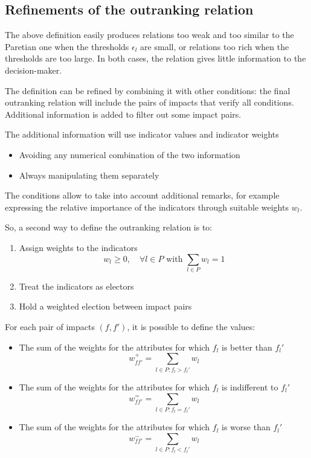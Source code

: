 \subsection{Refinements of the outranking relation}

The above definition easily produces relations too weak and too similar to the Paretian one when the thresholds $\epsilon_l$ are small, or relations too rich when the thresholds are too large. In both cases, the relation gives little information to the decision-maker.

The definition can be refined by combining it with other conditions: the final outranking relation will include the pairs of impacts that verify all conditions. Additional information is added to filter out some impact pairs.

The additional information will use indicator values and indicator weights
\begin{itemize}
	\item Avoiding any numerical combination of the two information
	
	\item Always manipulating them separately
\end{itemize}

The conditions allow to take into account additional remarks, for example expressing the relative importance of the indicators through suitable weights $w_l$.

So, a second way to define the outranking relation is to:
\begin{enumerate}
	\item Assign weights to the indicators
	$$ w_l \geq 0, \quad \forall l \in P \text{ with } \sum_{l \in P} w_l = 1 $$
	
	\item Treat the indicators as electors
	
	\item Hold a weighted election between impact pairs
\end{enumerate}

For each pair of impacts $(f, f')$, it is possible to define the values: 
\begin{itemize}
	\item The sum of the weights for the attributes for which $f_l$ is better than $f_l '$
	$$ w_{f f'}^+ = \sum_{l \in P: f_l > f_l'} w_l $$
	
	\item The sum of the weights for the attributes for which $f_l$ is indifferent to $f_l '$
	$$ w_{f f'}^= = \sum_{l \in P: f_l = f_l'} w_l $$
	
	\item The sum of the weights for the attributes for which $f_l$ is worse than $f_l '$
	$$ w_{f f'}^- = \sum_{l \in P: f_l < f_l'} w_l $$
\end{itemize}

